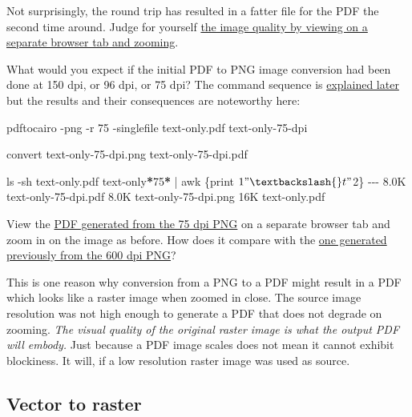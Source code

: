 \documentclass[
  11pt,
  british,
  a4paper,
]{article}
\newenvironment{Shaded}{\begin{snugshade}}{\end{snugshade}}
\newcommand{\AttributeTok}[1]{\textcolor[rgb]{0.80,0.80,0.80}{#1}}
\newcommand{\ExtensionTok}[1]{\textcolor[rgb]{0.80,0.80,0.80}{#1}}
\newcommand{\FunctionTok}[1]{\textcolor[rgb]{0.94,0.94,0.56}{#1}}
\newcommand{\KeywordTok}[1]{\textcolor[rgb]{0.94,0.87,0.69}{#1}}
\newcommand{\NormalTok}[1]{\textcolor[rgb]{0.80,0.80,0.80}{#1}}
\newcommand{\PreprocessorTok}[1]{\textcolor[rgb]{1.00,0.81,0.69}{\textbf{#1}}}
\newcommand{\StringTok}[1]{\textcolor[rgb]{0.80,0.58,0.58}{#1}}
\begin{document}
Not surprisingly, the round trip has resulted in a fatter file for the
PDF the second time around. Judge for yourself
\href{images/text-only-from-600-dpi-PNG.pdf}{the image quality by
viewing on a separate browser tab and zooming}.

What would you expect if the initial PDF to PNG image conversion had
been done at 150 dpi, or 96 dpi, or 75 dpi? The command sequence is
\protect\hyperlink{pdf-to-png-and-jpeg-poppler-and-cairo}{explained
later} but the results and their consequences are noteworthy here:

\begin{Shaded}
\begin{Highlighting}[]
\ExtensionTok{pdftocairo} \AttributeTok{{-}png} \AttributeTok{{-}r}\NormalTok{ 75 }\AttributeTok{{-}singlefile}\NormalTok{ text{-}only.pdf text{-}only{-}75{-}dpi}

\ExtensionTok{convert}\NormalTok{ text{-}only{-}75{-}dpi.png text{-}only{-}75{-}dpi.pdf}

\FunctionTok{ls} \AttributeTok{{-}sh}\NormalTok{ text{-}only.pdf text{-}only}\PreprocessorTok{*}\NormalTok{75}\PreprocessorTok{*} \KeywordTok{|} \FunctionTok{awk} \StringTok{\textquotesingle{}\{print $1 "\textbackslash{}t" $2\}\textquotesingle{}}
\ExtensionTok{{-}{-}{-}}
\ExtensionTok{8.0K}\NormalTok{    text{-}only{-}75{-}dpi.pdf}
\ExtensionTok{8.0K}\NormalTok{    text{-}only{-}75{-}dpi.png}
\ExtensionTok{16K}\NormalTok{     text{-}only.pdf}
\end{Highlighting}
\end{Shaded}

View the \href{images/text-only-75-dpi.pdf}{PDF generated from the 75
dpi PNG} on a separate browser tab and zoom in on the image as before.
How does it compare with the
\href{images/text-only-from-600-dpi-PNG.pdf}{one generated previously
from the 600 dpi PNG}?

This is one reason why conversion from a PNG to a PDF might result in a
PDF which looks like a raster image when zoomed in close. The source
image resolution was not high enough to generate a PDF that does not
degrade on zooming. \emph{The visual quality of the original raster
image is what the output PDF will embody.} Just because a PDF image
scales does not mean it cannot exhibit blockiness. It will, if a low
resolution raster image was used as source.

\hypertarget{vector-to-raster}{%
\subsection{Vector to raster}\label{vector-to-raster}}
\end{document}

